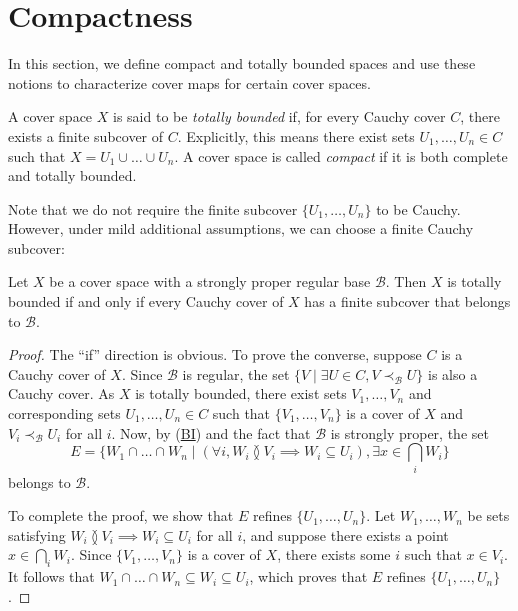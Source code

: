 \documentclass[pdflatex,sn-mathphys-num]{sn-jnl}
\newcommand{\axref}[1]{(\hyperref[ax:#1]{#1})}
\theoremstyle{definition}
\theoremstyle{remark}
\numberwithin{figure}{section}
\newcommand{\overlap}[2]{#1 \between #2}
\newcommand{\rb}{\prec}
\begin{document}
\section{Compactness}
\label{sec:compact}

In this section, we define compact and totally bounded spaces and use these notions to characterize cover maps for certain cover spaces.

A cover space $X$ is said to be \emph{totally bounded} if, for every Cauchy cover $C$, there exists a finite subcover of $C$.
Explicitly, this means there exist sets $U_1, \ldots, U_n \in C$ such that $X = U_1 \cup \ldots \cup U_n$.
A cover space is called \emph{compact} if it is both complete and totally bounded.

Note that we do not require the finite subcover $\{ U_1, \ldots, U_n \}$ to be Cauchy.
However, under mild additional assumptions, we can choose a finite Cauchy subcover:

\begin{prop}
Let $X$ be a cover space with a strongly proper regular base $\mathcal{B}$.
Then $X$ is totally bounded if and only if every Cauchy cover of $X$ has a finite subcover that belongs to $\mathcal{B}$.
\end{prop}
\begin{proof}
The ``if'' direction is obvious.
To prove the converse, suppose $C$ is a Cauchy cover of $X$.
Since $\mathcal{B}$ is regular, the set $\{ V \mid \exists U \in C, V \rb_\mathcal{B} U \}$ is also a Cauchy cover.
As $X$ is totally bounded, there exist sets $V_1, \ldots, V_n$ and corresponding sets $U_1, \ldots, U_n \in C$ such that $\{ V_1, \ldots, V_n \}$ is a cover of $X$ and $V_i \rb_\mathcal{B} U_i$ for all $i$.
Now, by \axref{BI} and the fact that $\mathcal{B}$ is strongly proper, the set
\[ E = \{ W_1 \cap \ldots \cap W_n \mid (\forall i, \overlap{W_i}{V_i} \implies W_i \subseteq U_i), \exists x \in \bigcap_i W_i \} \]
belongs to $\mathcal{B}$.

To complete the proof, we show that $E$ refines $\{ U_1, \ldots, U_n \}$.
Let $W_1, \ldots, W_n$ be sets satisfying $\overlap{W_i}{V_i} \implies W_i \subseteq U_i$ for all $i$, and suppose there exists a point $x \in \bigcap_i W_i$.
Since $\{ V_1, \ldots, V_n \}$ is a cover of $X$, there exists some $i$ such that $x \in V_i$.
It follows that $W_1 \cap \ldots \cap W_n \subseteq W_i \subseteq U_i$, which proves that $E$ refines $\{ U_1, \ldots, U_n \}$.
\end{proof}
\end{document}
